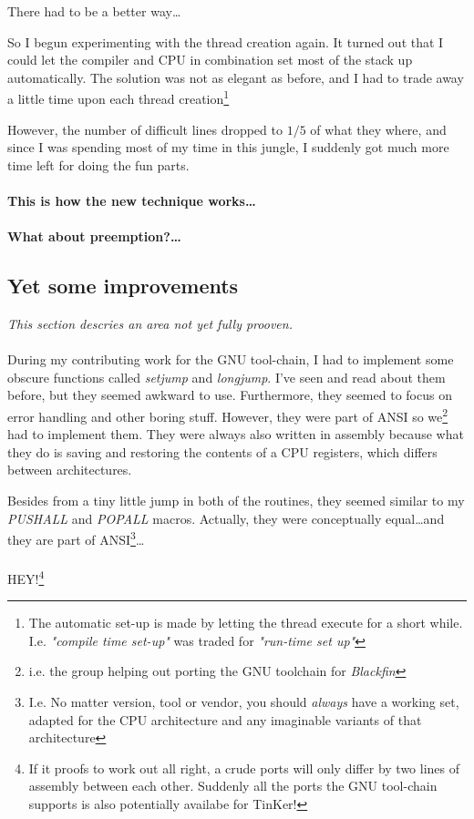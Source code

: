 {		There had to be a better way\ldots

		So I begun experimenting with the thread creation again. It turned out that I could let the compiler and CPU in combination set most of the stack up automatically. The solution was not as elegant as before, and I had to trade away a little time upon each thread creation\footnote{The automatic set-up is made by letting the thread execute for a short while. I.e. \textit{"compile time set-up"} was traded for \textit{"run-time set up"} }

		However, the number of difficult lines dropped to $1/5$ of what they where, and since I was spending most of my time in this jungle, I suddenly got much more time left for doing the fun parts.

		\paragraph{This is how the new technique works\ldots} 

		\paragraph{What about preemption?\ldots} 

	\subsection{Yet some improvements}
	\textit{This section descries an area not yet fully prooven.}\\\\
		During my contributing work for the GNU tool-chain, I had to implement some obscure functions called \textsl{setjump} and \textsl{longjump}. I've seen and read about them before, but they seemed awkward to use. Furthermore, they seemed to focus on error handling and other boring stuff. However, they were part of ANSI so we\footnote{i.e. the group helping out porting the GNU toolchain for \textit{Blackfin}} had to implement them. They were always also written in assembly because what they do is saving and restoring the contents of a CPU registers, which differs between architectures.

		Besides from a tiny little jump in both of the routines, they seemed similar to my \textit{PUSHALL} and \textit{POPALL} macros. Actually, they were conceptually equal\ldots and they are part of ANSI\footnote{I.e. No matter version, tool or vendor, you should \textit{always} have a working set, adapted for the CPU architecture and any imaginable variants of that architecture}\ldots
		\\\\
		HEY!\footnote{If it proofs to work out all right, a crude ports will only differ by two lines of assembly between each other. Suddenly all the ports the GNU tool-chain supports is also potentially availabe for TinKer!}

}%

